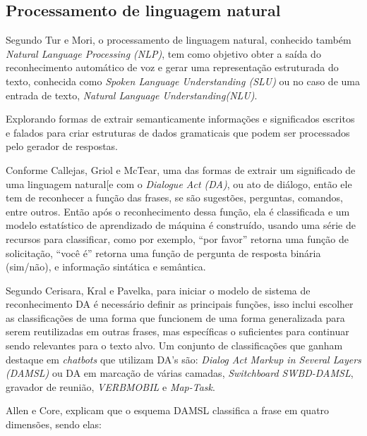 \documentclass[
	12pt,				%
	oneside,
	a4paper,			%
	english,			%
	french,				%
	spanish,			%
	brazil				%
	]{abntex2}
\begin{document}
\subsection{Processamento de linguagem natural}
Segundo Tur e Mori\supercite{spoken-language-understan.}, o processamento de linguagem natural, conhecido também \emph{Natural Language Processing (NLP)}, tem como objetivo obter a saída do reconhecimento automático de voz e gerar uma representação estruturada do texto, conhecida como \emph{Spoken Language Understanding (SLU)} ou no caso de uma entrada de texto, \emph{Natural Language Understanding(NLU)}.

Explorando formas de extrair semanticamente informações e significados escritos e falados para criar estruturas de dados gramaticais que podem ser processados pelo gerador de respostas.

Conforme Callejas, Griol e McTear\supercite{conversational-interface}, uma das formas de extrair um significado de uma linguagem natural[e com o \emph{Dialogue Act (DA)}, ou ato de diálogo, então ele tem de reconhecer a função das frases, se são sugestões, perguntas, comandos, entre outros. Então após o reconhecimento dessa função, ela é classificada e um modelo estatístico de aprendizado de máquina é construído, usando uma série de recursos para classificar, como por exemplo, “por favor” retorna uma função de solicitação, “você é” retorna uma função de pergunta de resposta binária (sim/não), e informação sintática e semântica.

Segundo Cerisara, Kral e Pavelka\supercite{da-recognition}, para iniciar o modelo de sistema de reconhecimento DA é necessário definir as principais funções, isso inclui escolher as classificações de uma forma que funcionem de uma forma generalizada para serem reutilizadas em outras frases, mas específicas o suficientes para continuar sendo relevantes para o texto alvo. Um conjunto de classificações que ganham destaque em \emph{chatbots} que utilizam DA's são: \emph{Dialog Act Markup in Several Layers (DAMSL)} ou DA em marcação de várias camadas, \emph{Switchboard SWBD-DAMSL}, gravador de reunião, \emph{VERBMOBIL} e \emph{Map-Task}.

Allen e Core\supercite{damsl}, explicam que o esquema DAMSL classifica a frase em quatro dimensões, sendo elas:
\end{document}
